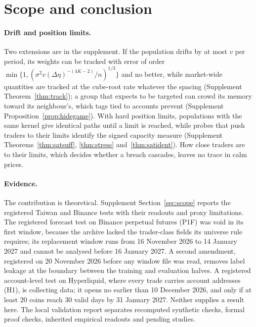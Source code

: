 \documentclass[12pt]{article}
\theoremstyle{definition}
\theoremstyle{remark}
\begin{document}
\section{Scope and conclusion}\label{n:concl}

\paragraph{Drift and position limits.} Two extensions are in the supplement. If the population drifts by at most $v$ per period, its weights can be tracked with error of order $\min\{1,(\sigma^2v(\Delta\eta)^{-(4K-2)}/n)^{1/3}\}$ and no better, while market-wide quantities are tracked at the cube-root rate whatever the spacing (Supplement Theorem~\ref{thm:track}); a group that expects to be targeted can crowd its memory toward its neighbour's, which tags tied to accounts prevent (Supplement Proposition~\ref{prop:hidegame}). With hard position limits, populations with the same kernel give identical paths until a limit is reached, while probes that push traders to their limits identify the signed capacity measure (Supplement Theorems~\ref{thm:satsuff}, \ref{thm:stress} and~\ref{thm:satident}). How close traders are to their limits, which decides whether a breach cascades, leaves no trace in calm prices.


\paragraph{Evidence.} The contribution is theoretical. Supplement Section~\ref{sec:scope} reports the registered Taiwan and Binance tests with their readouts and proxy limitations. The registered forecast test on Binance perpetual futures (P1F) was void in its first window, because the archive lacked the trader-class fields its universe rule requires; its replacement window runs from 16 November 2026 to 14 January 2027 and cannot be analysed before 16 January 2027. A second amendment, registered on 20 November 2026 before any window file was read, removes label leakage at the boundary between the training and evaluation halves. A registered account-level test on Hyperliquid, where every trade carries account addresses (H1), is collecting data; it opens no earlier than 10 December 2026, and only if at least 20 coins reach 30 valid days by 31 January 2027. Neither supplies a result here. The local validation report separates recomputed synthetic checks, formal proof checks, inherited empirical readouts and pending studies.
\end{document}
